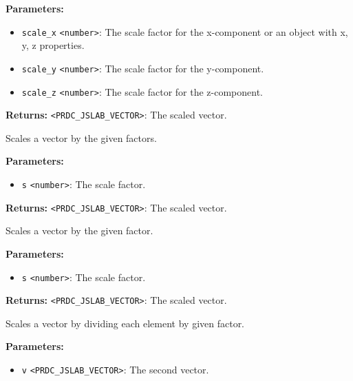 \documentclass[12pt,a4paper]{article}
\begin{document}
\noindent \textbf{Parameters:}
\begin{itemize}
  \item \texttt{scale\_x} \texttt{<number>}: The scale factor for the x-component or an object with x, y, z properties.
  \item \texttt{scale\_y} \texttt{<number>}: The scale factor for the y-component.
  \item \texttt{scale\_z} \texttt{<number>}: The scale factor for the z-component.
\end{itemize}

\noindent \textbf{Returns:} \texttt{<PRDC\_JSLAB\_VECTOR>}: The scaled vector.

\noindent Scales a vector by the given factors.

\vspace{5mm}
\noindent {}


\noindent \textbf{Parameters:}
\begin{itemize}
  \item \texttt{s} \texttt{<number>}: The scale factor.
\end{itemize}

\noindent \textbf{Returns:} \texttt{<PRDC\_JSLAB\_VECTOR>}: The scaled vector.

\noindent Scales a vector by the given factor.

\vspace{5mm}
\noindent {}


\noindent \textbf{Parameters:}
\begin{itemize}
  \item \texttt{s} \texttt{<number>}: The scale factor.
\end{itemize}

\noindent \textbf{Returns:} \texttt{<PRDC\_JSLAB\_VECTOR>}: The scaled vector.

\noindent Scales a vector by dividing each element by given factor.

\vspace{5mm}
\noindent {}


\noindent \textbf{Parameters:}
\begin{itemize}
  \item \texttt{v} \texttt{<PRDC\_JSLAB\_VECTOR>}: The second vector.
\end{itemize}
\end{document}
